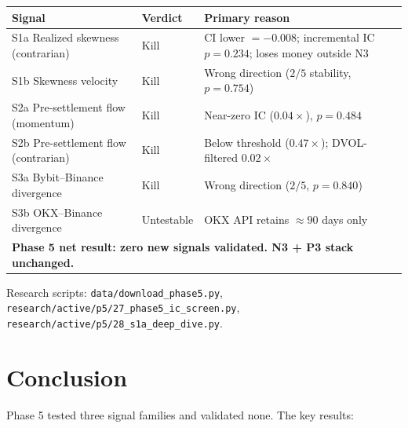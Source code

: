 \documentclass[12pt, a4paper]{article}
\theoremstyle{plain}
\theoremstyle{definition}
\begin{document}
\begin{center}
\begin{tabular}{lll}
\toprule
Signal & Verdict & Primary reason \\
\midrule
S1a Realized skewness (contrarian) & Kill & CI lower $= -0.008$; incremental IC $p = 0.234$;
  loses money outside N3 \\
S1b Skewness velocity & Kill & Wrong direction ($2/5$ stability, $p = 0.754$) \\
S2a Pre-settlement flow (momentum) & Kill & Near-zero IC ($0.04\times$), $p = 0.484$ \\
S2b Pre-settlement flow (contrarian) & Kill & Below threshold ($0.47\times$); DVOL-filtered $0.02\times$ \\
S3a Bybit--Binance divergence & Kill & Wrong direction ($2/5$, $p = 0.840$) \\
S3b OKX--Binance divergence & Untestable & OKX API retains $\approx 90$ days only \\
\midrule
\multicolumn{3}{l}{\textbf{Phase 5 net result: zero new signals validated.  N3 + P3 stack unchanged.}} \\
\bottomrule
\end{tabular}
\end{center}

Research scripts: \texttt{data/download\_phase5.py},
\texttt{research/active/p5/27\_phase5\_ic\_screen.py},
\texttt{research/active/p5/28\_s1a\_deep\_dive.py}.

\section{Conclusion}
\label{sec:conclusion}

Phase 5 tested three signal families and validated none.  The key results:
\end{document}
